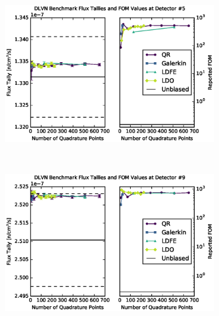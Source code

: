 \begin{figure}[!htb]
\begin{subfigure}{\linewidth}
\centering
\includegraphics[max height=0.445\textheight]
{img/dlvn-plots/mcnp/fwc-5.eps}
\label{dlvn-fwc-5}
\end{subfigure} 
\\
\begin{subfigure}{\linewidth}
\centering
\includegraphics[max height=0.445\textheight]
{img/dlvn-plots/mcnp/fwc-9.eps}
\label{dlvn-fwc-9}
\end{subfigure}
\end{figure}
\clearpage
